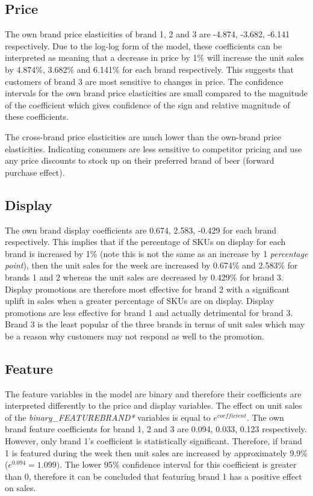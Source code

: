 \documentclass[a4paper,11pt]{article}
\begin{document}
\subsection{Price}

The own brand price elasticities of brand 1, 2 and 3 are -4.874, -3.682, -6.141 respectively. Due to the log-log form of the model, these coefficients can be interpreted as meaning that a decrease in price by 1\% will increase the unit sales by 4.874\%, 3.682\% and 6.141\% for each brand respectively. This suggests that customers of brand 3 are most sensitive to changes in price. The confidence intervals for the own brand price elasticities are small compared to the magnitude of the coefficient which gives confidence of the sign and relative magnitude of these coefficients.

The cross-brand price elasticities are much lower than the own-brand price elasticities. Indicating consumers are less sensitive to competitor pricing and use any price discounts to stock up on their preferred brand of beer (forward purchase effect).


\subsection{Display}

The own brand display coefficients are 0.674, 2.583, -0.429 for each brand respectively. This implies that if the percentage of SKUs on display for each brand is increased by 1\% (note this is not the same as an increase by 1 \textit{percentage point}), then the unit sales for the week are increased by 0.674\% and 2.583\% for brands 1 and 2 whereas the unit sales are decreased by 0.429\% for brand 3. Display promotions are therefore most effective for brand 2 with a significant uplift in sales when a greater percentage of SKUs are on display. Display promotions are less effective for brand 1 and actually detrimental for brand 3. Brand 3 is the least popular of the three brands in terms of unit sales which may be a reason why customers may not respond as well to the promotion.

\subsection{Feature}

The feature variables in the model are binary and therefore their coefficients are interpreted differently to the price and display variables. The effect on unit sales of the \textit{binary\_FEATUREBRAND*} variables is equal to $e^{coefficient}$. The own brand feature coefficients for brand 1, 2 and 3 are 0.094, 0.033, 0.123 respectively. However, only brand 1's coefficient is statistically significant. Therefore, if brand 1 is featured during the week then unit sales are increased by approximately 9.9\% ($e^{0.094} = 1.099)$. The lower 95\% confidence interval for this coefficient is greater than 0, therefore it can be concluded that featuring brand 1 has a positive effect on sales.
\end{document}

